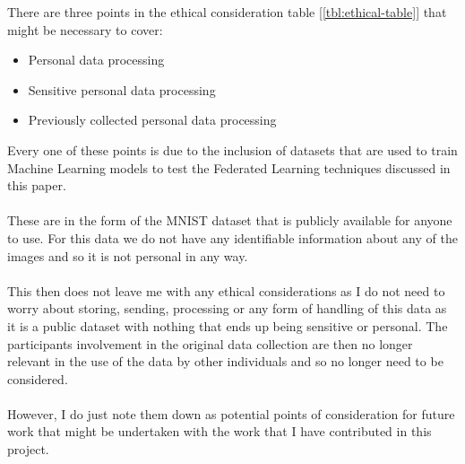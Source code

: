 There are three points in the ethical consideration table [\ref{tbl:ethical-table}] that might be necessary to cover:
\begin{itemize}
    \item Personal data processing
    \item Sensitive personal data processing
    \item Previously collected personal data processing
\end{itemize}
Every one of these points is due to the inclusion of datasets that are used to train Machine Learning models to test the Federated Learning techniques discussed in this paper.
\\ \\
These are in the form of the MNIST dataset that is publicly available for anyone to use. 
For this data we do not have any identifiable information about any of the images and so it is not personal in any way.
\\ \\
This then does not leave me with any ethical considerations as I do not need to worry about storing, sending, processing or any form of handling of this data as it is a public dataset with nothing that ends up being sensitive or personal. 
The participants involvement in the original data collection are then no longer relevant in the use of the data by other individuals and so no longer need to be considered.
\\ \\
However, I do just note them down as potential points of consideration for future work that might be undertaken with the work that I have contributed in this project.